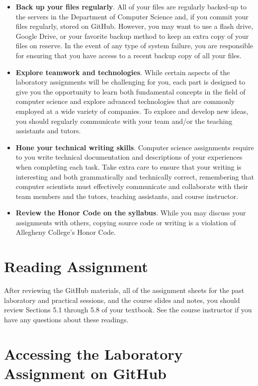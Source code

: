 \documentclass[11pt]{article}
\begin{document}
\begin{itemize}
\item {\bf Back up your files regularly}. All of your files are regularly backed-up to the servers in the Department of
  Computer Science and, if you commit your files regularly, stored on GitHub. However, you may want to use a flash
  drive, Google Drive, or your favorite backup method to keep an extra copy of your files on reserve. In the event of
  any type of system failure, you are responsible for ensuring that you have access to a recent backup copy of all your
  files.

\item {\bf Explore teamwork and technologies}. While certain aspects of the laboratory assignments will be challenging
  for you, each part is designed to give you the opportunity to learn both fundamental concepts in the field of computer
  science and explore advanced technologies that are commonly employed at a wide variety of companies. To explore and
  develop new ideas, you should regularly communicate with your team and/or the teaching assistants and tutors.

\item {\bf Hone your technical writing skills}. Computer science assignments require to you write technical
  documentation and descriptions of your experiences when completing each task. Take extra care to ensure that your
  writing is interesting and both grammatically and technically correct, remembering that computer scientists must
  effectively communicate and collaborate with their team members and the tutors, teaching assistants, and course
  instructor.

\item {\bf Review the Honor Code on the syllabus}. While you may discuss your assignments with others, copying source
  code or writing is a violation of Allegheny College's Honor Code.

\end{itemize}

\section*{Reading Assignment}

After reviewing the GitHub materials, all of the assignment sheets for the past laboratory and practical sessions, and
the course slides and notes, you should review Sections 5.1 through 5.8 of your textbook. See the course instructor if
you have any questions about these readings.

\section*{Accessing the Laboratory Assignment on GitHub}
\end{document}
